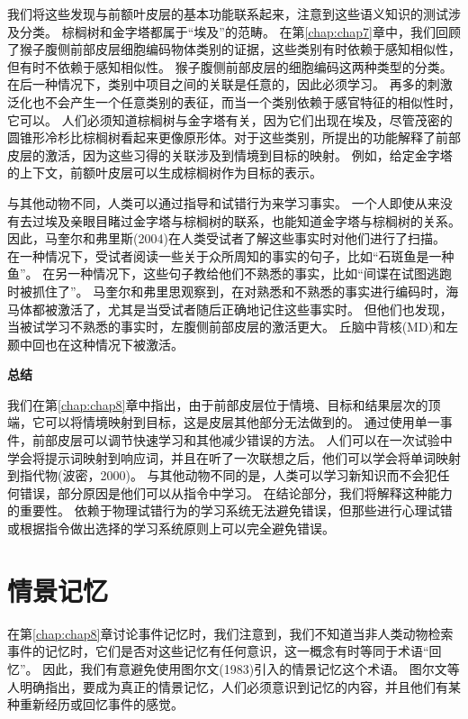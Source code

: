 我们将这些发现与前额叶皮层的基本功能联系起来，注意到这些语义知识的测试涉及分类。
棕榈树和金字塔都属于“埃及”的范畴。
在第\ref{chap:chap7}章中，我们回顾了猴子腹侧前部皮层细胞编码物体类别的证据，这些类别有时依赖于感知相似性，但有时不依赖于感知相似性。
猴子腹侧前部皮层的细胞编码这两种类型的分类。
在后一种情况下，类别中项目之间的关联是任意的，因此必须学习。
再多的刺激泛化也不会产生一个任意类别的表征，而当一个类别依赖于感官特征的相似性时，它可以。
人们必须知道棕榈树与金字塔有关，因为它们出现在埃及，尽管茂密的圆锥形冷杉比棕榈树看起来更像原形体。对于这些类别，所提出的功能解释了前部皮层的激活，因为这些习得的关联涉及到情境到目标的映射。
例如，给定金字塔的上下文，前额叶皮层可以生成棕榈树作为目标的表示。
\par


与其他动物不同，人类可以通过指导和试错行为来学习事实。
一个人即使从来没有去过埃及亲眼目睹过金字塔与棕榈树的联系，也能知道金字塔与棕榈树的关系。
因此，马奎尔和弗里斯(2004)在人类受试者了解这些事实时对他们进行了扫描。
在一种情况下，受试者阅读一些关于众所周知的事实的句子，比如“石斑鱼是一种鱼”。
在另一种情况下，这些句子教给他们不熟悉的事实，比如“间谍在试图逃跑时被抓住了”。
马奎尔和弗里思观察到，在对熟悉和不熟悉的事实进行编码时，海马体都被激活了，尤其是当受试者随后正确地记住这些事实时。
但他们也发现，当被试学习不熟悉的事实时，左腹侧前部皮层的激活更大。
丘脑中背核(MD)和左颞中回也在这种情况下被激活。
\par



\textbf{总结}
\par
我们在第\ref{chap:chap8}章中指出，由于前部皮层位于情境、目标和结果层次的顶端，它可以将情境映射到目标，这是皮层其他部分无法做到的。
通过使用单一事件，前部皮层可以调节快速学习和其他减少错误的方法。
人们可以在一次试验中学会将提示词映射到响应词，并且在听了一次联想之后，他们可以学会将单词映射到指代物(波密，2000)。
与其他动物不同的是，人类可以学习新知识而不会犯任何错误，部分原因是他们可以从指令中学习。
在结论部分，我们将解释这种能力的重要性。
依赖于物理试错行为的学习系统无法避免错误，但那些进行心理试错或根据指令做出选择的学习系统原则上可以完全避免错误。



\section{情景记忆}

在第\ref{chap:chap8}章讨论事件记忆时，我们注意到，我们不知道当非人类动物检索事件的记忆时，它们是否对这些记忆有任何意识，这一概念有时等同于术语“回忆”。
因此，我们有意避免使用图尔文(1983)引入的情景记忆这个术语。
图尔文等人明确指出，要成为真正的情景记忆，人们必须意识到记忆的内容，并且他们有某种重新经历或回忆事件的感觉。
\par



